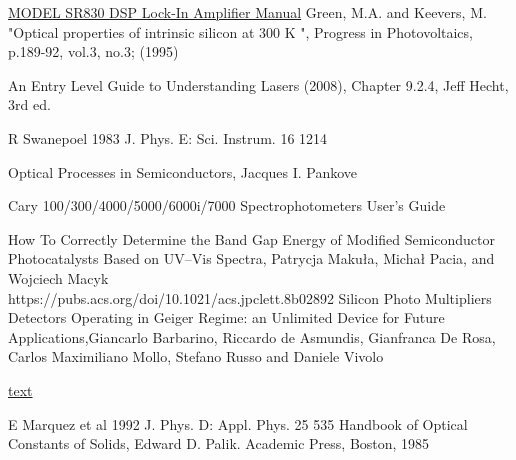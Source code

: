 \documentclass[10pt,a4paper]{article}
\begin{document}
\begin{multicols}{2}
\begin{thebibliography}{9}
\href{https://www.thinksrs.com/downloads/pdfs/manuals/SR830m.pdf}{MODEL SR830 DSP Lock-In Amplifier Manual}
Green, M.A. and Keevers, M. "Optical properties of intrinsic silicon at 300 K ", Progress in Photovoltaics, p.189-92, vol.3, no.3; (1995)

An Entry Level Guide to Understanding Lasers (2008), Chapter 9.2.4, Jeff Hecht, 3rd ed. 

R Swanepoel 1983 J. Phys. E: Sci. Instrum. 16 1214

Optical Processes in Semiconductors, Jacques I. Pankove

Cary 100/300/4000/5000/6000i/7000 Spectrophotometers User's Guide

How To Correctly Determine the Band Gap Energy of Modified Semiconductor Photocatalysts Based on UV–Vis Spectra, Patrycja Makuła, Michał Pacia, and Wojciech Macyk\\https://pubs.acs.org/doi/10.1021/acs.jpclett.8b02892
Silicon Photo Multipliers Detectors Operating in Geiger Regime: an Unlimited Device for Future Applications,Giancarlo Barbarino, Riccardo de Asmundis, Gianfranca De Rosa, Carlos Maximiliano Mollo, Stefano Russo and Daniele Vivolo


 \href{https://erdogant.github.io/findpeaks/pages/html/Examples.html#find-peaks-in-low-sampled-dataset}{text}


 E Marquez et al 1992 J. Phys. D: Appl. Phys. 25 535
Handbook of Optical Constants of Solids, Edward D. Palik. Academic Press, Boston, 1985 
\end{thebibliography}


\end{multicols}
\end{document}
